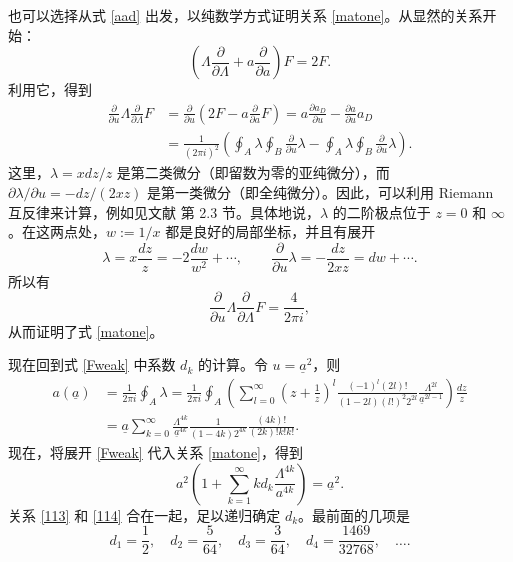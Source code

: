 也可以选择从式 \eqref{aad} 出发，以纯数学方式证明关系 \eqref{matone}。从显然的关系开始：
\begin{equation}
(\Lambda\frac{\partial}{\partial\Lambda}+a\frac{\partial}{\partial a})F=2F.
\end{equation}
利用它，得到
\begin{align}
\frac{\partial}{\partial u}\Lambda\frac{\partial}{\partial\Lambda}F
&=\frac{\partial}{\partial u}(2F-a\frac{\partial}{\partial a}F)
=a\frac{\partial a_D}{\partial u}-\frac{\partial a}{\partial u}a_D\\
&=\frac1{(2\pi i)^2}\left(\oint_A\lambda\oint_B\frac{\partial}{\partial u}\lambda-\oint_A\lambda\oint_B\frac{\partial}{\partial u}\lambda\right).
\end{align}
这里，$\lambda=xdz/z$ 是第二类微分（即留数为零的亚纯微分），而 $\partial\lambda/\partial u=-dz/(2xz)$ 是第一类微分（即全纯微分）。因此，可以利用 Riemann 互反律来计算，例如见文献 \cite{GH} 第 2.3 节。具体地说，$\lambda$ 的二阶极点位于 $z=0$ 和 $\infty$。在这两点处，$w:=1/x$ 都是良好的局部坐标，并且有展开
\begin{equation}
\lambda=x\frac{dz}z=-2\frac{dw}{w^2}+\cdots,\qquad
\frac{\partial}{\partial u}\lambda=-\frac{dz}{2xz}=dw+\cdots.
\end{equation}
所以有
\begin{equation}
\frac{\partial}{\partial u}\Lambda\frac{\partial}{\partial\Lambda}F=\frac4{2\pi i},
\end{equation}
从而证明了式 \eqref{matone}。

现在回到式 \eqref{Fweak} 中系数 $d_k$ 的计算。令 $u=\underline a^2$，则
\begin{align}
a(\underline a)&=\frac1{2\pi i}\oint_A\lambda=\frac1{2\pi i}\oint_A(\sum_{l=0}^\infty
(z+\frac1z)^l\frac{(-1)^l(2l)!}{(1-2l)(l!)^2 2^{2l}}
\frac{\Lambda^{2l}}{\underline a^{2l-1}})\frac{dz}z\\
&=\underline a\sum_{k=0}^\infty\frac{\Lambda^{4k}}{\underline a^{4k}}\frac1{(1-4k)2^{4k}}\frac{(4k)!}{(2k)!k!k!}.\label{113}
\end{align}
现在，将展开 \eqref{Fweak} 代入关系 \eqref{matone}，得到
\begin{equation}
a^2(1+\sum_{k=1}^\infty k d_k\frac{\Lambda^{4k}}{a^{4k}})=\underline a^2.\label{114}
\end{equation}
关系 \eqref{113} 和 \eqref{114} 合在一起，足以递归确定 $d_k$。最前面的几项是
\begin{equation}
d_1=\frac12,\quad d_2=\frac5{64},\quad d_3=\frac3{64},\quad d_4=\frac{1469}{32768},\quad\ldots.\label{results-from-curve}
\end{equation}

